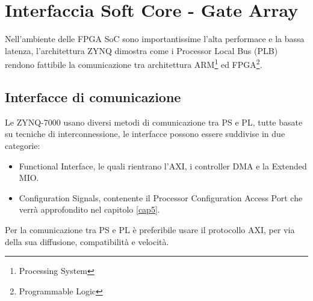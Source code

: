 \chapter{Interfaccia Soft Core - Gate Array}
\label{comunicazioneCap}
Nell'ambiente delle FPGA SoC sono importantissime l'alta performace e la bassa latenza, l'architettura ZYNQ dimostra come i Processor Local Bus (PLB) rendono fattibile la comunicazione tra architettura ARM\footnote{Processing System} ed FPGA\footnote{Programmable Logic}\cite{8358511}.\\
\section{Interfacce di comunicazione}
Le ZYNQ-7000 usano diversi metodi di comunicazione tra PS e PL, tutte basate su tecniche di interconnessione, le interfacce possono essere suddivise in due categorie\cite{Doc}:
\begin{itemize}
    \item Functional Interface, le quali rientrano l'AXI, i controller DMA e la Extended MIO.
    \item Configuration Signals, contenente il Processor Configuration Access Port che verrà approfondito nel capitolo \ref{cap5}.
\end{itemize}
Per la comunicazione tra PS e PL è preferibile usare il protocollo AXI, per via della sua diffusione, compatibilità e velocità.
